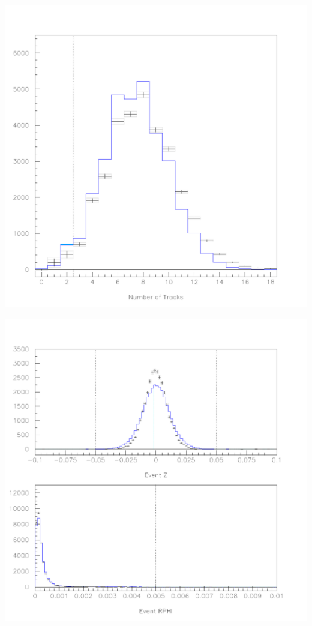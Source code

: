 \documentclass[landscape]{article}
\begin{document}
\begin{center}
  \includegraphics[height=\textheight]{tr2_tracks.pdf}
\end{center}

\begin{center}
  \includegraphics[height=\textheight]{tr2_ciwz.pdf}
\end{center}
\end{document}
